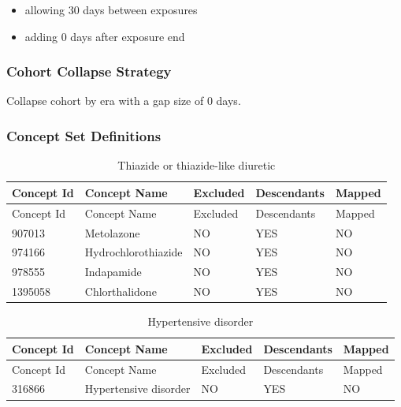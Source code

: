 \documentclass[11pt]{book}
\providecommand{\tightlist}{%
  \setlength{\itemsep}{0pt}\setlength{\parskip}{0pt}}
\theoremstyle{definition}
\theoremstyle{definition}
\theoremstyle{definition}
\theoremstyle{remark}
\begin{document}
\begin{itemize}
\tightlist
\item
  allowing 30 days between exposures
\item
  adding 0 days after exposure end
\end{itemize}

\subsubsection*{Cohort Collapse
Strategy}\label{cohort-collapse-strategy-4}

Collapse cohort by era with a gap size of 0 days.

\subsubsection*{Concept Set
Definitions}\label{concept-set-definitions-4}

\begin{longtable}[]{@{}lllll@{}}
\caption{\label{tab:thiazidesMono} Thiazide or thiazide-like
diuretic}\tabularnewline
\toprule
Concept Id & Concept Name & Excluded & Descendants &
Mapped\tabularnewline
\midrule
\endfirsthead
\toprule
Concept Id & Concept Name & Excluded & Descendants &
Mapped\tabularnewline
\midrule
\endhead
907013 & Metolazone & NO & YES & NO\tabularnewline
974166 & Hydrochlorothiazide & NO & YES & NO\tabularnewline
978555 & Indapamide & NO & YES & NO\tabularnewline
1395058 & Chlorthalidone & NO & YES & NO\tabularnewline
\bottomrule
\end{longtable}

\begin{longtable}[]{@{}lllll@{}}
\caption{\label{tab:hypertensionThzMono} Hypertensive
disorder}\tabularnewline
\toprule
Concept Id & Concept Name & Excluded & Descendants &
Mapped\tabularnewline
\midrule
\endfirsthead
\toprule
Concept Id & Concept Name & Excluded & Descendants &
Mapped\tabularnewline
\midrule
\endhead
316866 & Hypertensive disorder & NO & YES & NO\tabularnewline
\bottomrule
\end{longtable}
\end{document}
